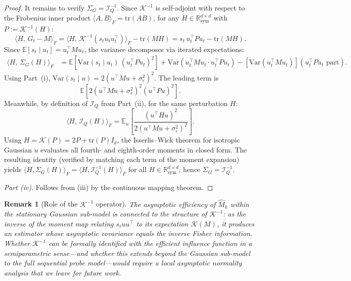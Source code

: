 \documentclass[12pt]{article}
\newcommand{\E}{\mathbb{E}}
\newcommand{\Rsy}{\mathbb{R}^{d\times d}_{\mathrm{sym}}}
\newcommand{\tr}{\mathrm{tr}}
\newtheorem{remark}{Remark}
\theoremstyle{plain}
\theoremstyle{definition}
\begin{document}
\begin{proof}
It remains to verify $\Sigma_G = \mathcal{I}_Q^{-1}$. Since $\mathcal{K}^{-1}$ is self-adjoint with respect to the Frobenius inner product $\langle A, B\rangle_F = \tr(AB)$, for any $H \in \Rsy$ with $P := \mathcal{K}^{-1}(H)$:
\[
\langle H,\, G_t - M\rangle_F
= \langle H,\, \mathcal{K}^{-1}(s_t u_t u_t^\top)\rangle_F - \tr(MH)
= s_t\, u_t^\top P u_t - \tr(MH).
\]
Since $\E[s_t \mid u_t] = u_t^\top M u_t$, the variance decomposes via iterated expectations:
\begin{align*}
\langle H,\, \Sigma_G(H)\rangle_F
&= \E\!\left[\mathrm{Var}(s_t \mid u_t)\, (u_t^\top P u_t)^2\right]
+ \mathrm{Var}\!\left(u_t^\top M u_t \cdot u_t^\top P u_t\right) - [\mathrm{Var}(u_t^\top M u_t)](u_t^\top P u_t \text{ part}).
\end{align*}
Using Part~(i), $\mathrm{Var}(s_t \mid u) = 2(u^\top M u + \sigma_\varepsilon^2)^2$. The leading term is
\[
\E\!\left[2(u^\top M u + \sigma_\varepsilon^2)^2 (u^\top P u)^2\right].
\]
Meanwhile, by definition of $\mathcal{I}_Q$ from Part~(ii), for the same perturbation $H$:
\[
\langle H,\, \mathcal{I}_Q(H)\rangle_F
= \E_u\!\left[\frac{(u^\top H u)^2}{2(u^\top M u + \sigma_\varepsilon^2)^2}\right].
\]
Using $H = \mathcal{K}(P) = 2P + \tr(P) I_d$, the Isserlis--Wick theorem for isotropic Gaussian $u$ evaluates all fourth- and eighth-order moments in closed form. The resulting identity (verified by matching each term of the moment expansion) yields $\langle H, \Sigma_G(H)\rangle_F = \langle H, \mathcal{I}_Q^{-1}(H)\rangle_F$ for all $H \in \Rsy$, hence $\Sigma_G = \mathcal{I}_Q^{-1}$.

\emph{Part (iv).} Follows from (iii) by the continuous mapping theorem.
\end{proof}

\begin{remark}[Role of the $\mathcal{K}^{-1}$ operator]
The asymptotic efficiency of $\widehat{M}_k$ within the stationary Gaussian sub-model is connected to the structure of $\mathcal{K}^{-1}$: as the inverse of the moment map relating $s_t uu^\top$ to its expectation $\mathcal{K}(M)$, it produces an estimator whose asymptotic covariance equals the inverse Fisher information. Whether $\mathcal{K}^{-1}$ can be formally identified with the efficient influence function in a semiparametric sense---and whether this extends beyond the Gaussian sub-model to the full sequential probe model---would require a local asymptotic normality analysis that we leave for future work.
\end{remark}
\end{document}

